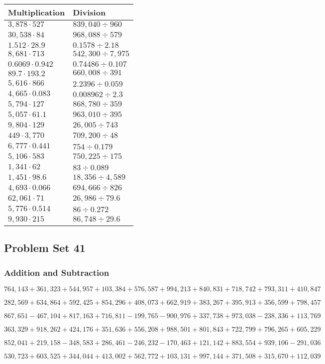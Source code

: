 \begin{longtable}[]{@{}ll@{}}
\toprule
Multiplication & Division\tabularnewline
\midrule
\endhead
\(3,878\cdot527\) & \(839,040÷960\)\tabularnewline
\(30,538\cdot84\) & \(968,088÷579\)\tabularnewline
\(1.512\cdot28.9\) & \(0.1578÷2.18\)\tabularnewline
\(8,681\cdot713\) & \(542,300÷7,975\)\tabularnewline
\(0.6069\cdot0.942\) & \(0.74486÷0.107\)\tabularnewline
\(89.7\cdot193.2\) & \(660,008÷391\)\tabularnewline
\(5,616\cdot866\) & \(2.2396÷0.059\)\tabularnewline
\(4,665\cdot0.083\) & \(0.008962÷2.3\)\tabularnewline
\(5,794\cdot127\) & \(868,780÷359\)\tabularnewline
\(5,057\cdot61.1\) & \(963,010÷395\)\tabularnewline
\(9,804\cdot129\) & \(26,005÷743\)\tabularnewline
\(449\cdot3,770\) & \(709,200÷48\)\tabularnewline
\(6,777\cdot0.441\) & \(754÷0.179\)\tabularnewline
\(5,106\cdot583\) & \(750,225÷175\)\tabularnewline
\(1,341\cdot62\) & \(83÷0.089\)\tabularnewline
\(1,451\cdot98.6\) & \(18,356÷4,589\)\tabularnewline
\(4,693\cdot0.066\) & \(694,666÷826\)\tabularnewline
\(62,061\cdot71\) & \(26,986÷79.6\)\tabularnewline
\(5,776\cdot0.514\) & \(86÷0.272\)\tabularnewline
\(9,930\cdot215\) & \(86,748÷29.6\)\tabularnewline
\bottomrule
\end{longtable}

\hypertarget{problem-set-41-5}{%
\subsection{Problem Set 41}\label{problem-set-41-5}}

\hypertarget{addition-and-subtraction-346}{%
\subsubsection{Addition and
Subtraction}\label{addition-and-subtraction-346}}

\(764,143+361,323+544,957+103,384+576,587+994,213+840,831+718,742+793,311+ 410,847\)

\(282,569+634,864+592,425+854,296+408,073+662,919+383,267+395,913+356,599+798,457\)

\(867,651-467,104+817,163+716,811-199,765-900,976+337,738+973,038-238,336+113,769\)

\(363,329+918,262+424,176+351,636+556,208+988,501+801,843+722,799+796,265+605,229\)

\(852,041+219,158-348,583+286,461-246,232-170,463+121,142+883,554+939,106-291,036\)

\(530,723+603,525+344,044+413,002+562,772+103,131+997,144+371,508+315,670+112,039\)

